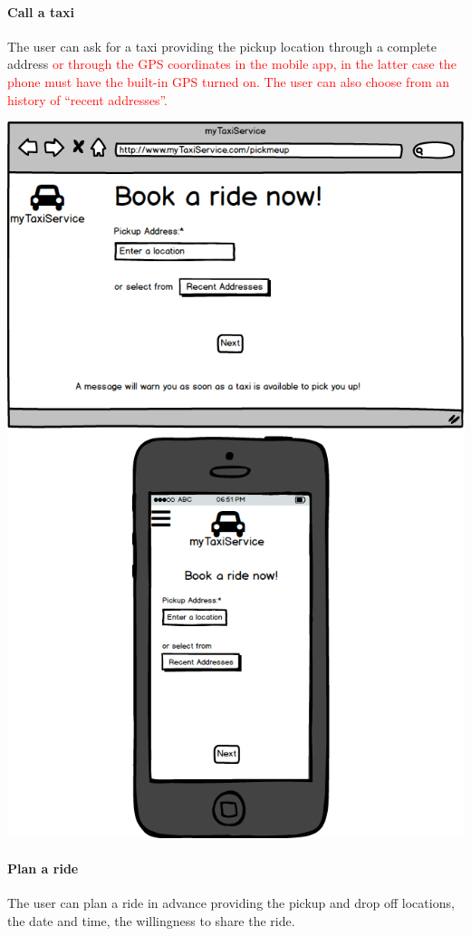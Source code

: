 \documentclass[a4paper,11pt]{report} %
\begin{document}
	\paragraph{Call a taxi} The user can ask for a taxi providing the pickup location through a complete address \textcolor{red}{or through the GPS coordinates in the mobile app, in the latter case the phone must have the built-in GPS turned on. The user can also choose from an history of ``recent addresses''.}
	\begin{center}
		\includegraphics[width=0.9\linewidth]{Pictures/BookARide}
	\end{center}
	
	\pagebreak
	
	\paragraph{Plan a ride} The user can plan a ride in advance providing the pickup and drop off locations, the date and time, the willingness to share the ride.
	
\end{document}
